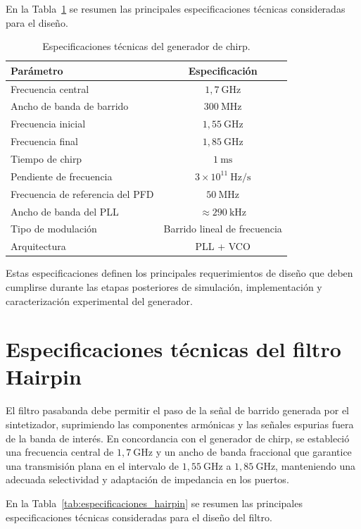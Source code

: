 En la Tabla~\ref{tab:especificaciones_chirp} se resumen las principales especificaciones técnicas consideradas para el diseño.

\begin{table}[h]
\centering
\begin{tabular}{lc}
\hline
\textbf{Parámetro} & \textbf{Especificación} \\
\hline
Frecuencia central & $1{,}7~\mathrm{GHz}$ \\
Ancho de banda de barrido & $300~\mathrm{MHz}$ \\
Frecuencia inicial & $1{,}55~\mathrm{GHz}$ \\
Frecuencia final & $1{,}85~\mathrm{GHz}$ \\
Tiempo de chirp & $1~\mathrm{ms}$ \\
Pendiente de frecuencia & $3\times10^{11}~\mathrm{Hz/s}$ \\
Frecuencia de referencia del PFD & $50~\mathrm{MHz}$ \\
Ancho de banda del PLL & $\approx 290~\mathrm{kHz}$ \\
Tipo de modulación & Barrido lineal de frecuencia \\
Arquitectura & PLL + VCO \\
\hline
\end{tabular}
\caption{Especificaciones técnicas del generador de chirp.}
\label{tab:especificaciones_chirp}
\end{table}

Estas especificaciones definen los principales requerimientos de diseño que deben cumplirse durante las etapas posteriores de simulación, implementación y caracterización experimental del generador.

\section{Especificaciones técnicas del filtro Hairpin}

El filtro pasabanda debe permitir el paso de la señal de barrido generada por el sintetizador, suprimiendo las componentes armónicas y las señales espurias fuera de la banda de interés. En concordancia con el generador de chirp, se estableció una frecuencia central de $1{,}7~\mathrm{GHz}$ y un ancho de banda fraccional que garantice una transmisión plana en el intervalo de $1{,}55~\mathrm{GHz}$ a $1{,}85~\mathrm{GHz}$, manteniendo una adecuada selectividad y adaptación de impedancia en los puertos.

En la Tabla~\ref{tab:especificaciones_hairpin} se resumen las principales especificaciones técnicas consideradas para el diseño del filtro.

